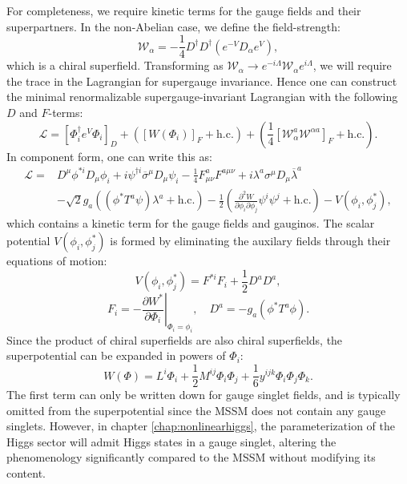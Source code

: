 For completeness, we require kinetic terms for the gauge fields and their superpartners. In the non-Abelian case, we define the field-strength: 
\begin{equation}
\mathcal{W}_{\alpha}=-\frac{1}{4}D^{\dagger}D^{\dagger}(e^{-V}D_{\alpha}e^{V}),
\end{equation}
which is a chiral superfield. Transforming as $\mathcal{W}_{\alpha} \rightarrow e^{-i\Lambda}\mathcal{W}_{\alpha}e^{i\Lambda}$, we will require the trace in the Lagrangian for supergauge invariance. Hence one can construct the minimal renormalizable supergauge-invariant Lagrangian with the following $D$ and $F$-terms:
\begin{equation}
\mathcal{L}=\left[\Phi_{i}^{\dagger}e^{V}\Phi_{i} \right]_{D} + \left( \left[ W(\Phi_i) \right]_{F} + \text{h.c.} \right) + \left( \frac{1}{4} \left[ \mathcal{W}^a_{\alpha}\mathcal{W}^{\alpha a} \right]_{F} +\text{h.c.}\right).
\label{eqn:susylagrang}
\end{equation}
In component form, one can write this as:
\begin{align}
\mathcal{L}=&D^{\mu}\phi^{*i}D_{\mu}\phi_{i}+i\psi^{\dagger i}\overline{\sigma}^{\mu}D_{\mu}\psi_{i}-\frac{1}{4}F^{a}_{\mu\nu}F^{a\mu\nu}+i\lambda^{a}\sigma^{\mu}D_{\mu}\overline{\lambda}^{a} \nonumber \\
&-\sqrt{2}g_{a}((\phi^{*}T^{a}\psi)\lambda^{a}+\text{h.c.})-\frac{1}{2}\left( \frac{\partial^2 W}{\partial\phi_{i} \partial\phi_{j}}\psi^{i}\psi^{j}+\text{h.c.} \right)-V(\phi_{i},\phi^{*}_{j}),
\end{align}
which contains a kinetic term for the gauge fields and gauginos. The scalar potential $V(\phi_{i},\phi^{*}_{j})$ is formed by eliminating the auxilary fields through their equations of motion:
\begin{equation}
V(\phi_{i},\phi^{*}_{j})=F^{*i}F_{i}+\frac{1}{2}D^{a}D^{a},
\end{equation}
\begin{equation}
F_{i}=-\left. \frac{\partial W^{*}}{\partial \Phi_{i}}\right|_{\Phi_{i}=\phi_{i}},\quad D^{a}=-g_{a}(\phi^{*}T^{a}\phi).
\end{equation}
Since the product of chiral superfields are also chiral superfields, the superpotential can be expanded in powers of $\Phi_{i}$:
\begin{equation}
W(\Phi)=L^{i}\Phi_{i}+\frac{1}{2}M^{ij}\Phi_{i}\Phi_{j}+\frac{1}{6}y^{ijk}\Phi_{i}\Phi_{j}\Phi_{k}.
\end{equation}
The first term can only be written down for gauge singlet fields, and is typically omitted from the superpotential since the MSSM does not contain any gauge singlets. However, in chapter \ref{chap:nonlinearhiggs}, the parameterization of the Higgs sector will admit Higgs states in a gauge singlet, altering the phenomenology significantly compared to the MSSM without modifying its content.

